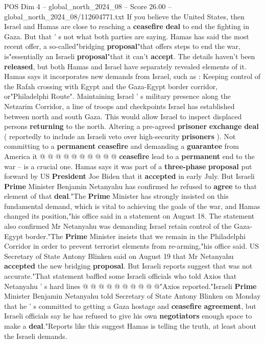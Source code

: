 \begin{textsample}{POS Dim 4 – global\_north\_2024\_08 – Score 26.00 – global\_north\_2024\_08/112604771.txt}  \label{ex:f4_pos_164}
If you believe the United States, then Israel and Hamas are close to reaching a \textbf{ceasefire} \textbf{deal} to end the fighting in Gaza.
But that ' s not what both parties are saying.
Hamas has said the most recent offer, a so-called"bridging \textbf{proposal}"that offers steps to end the war, is"essentially an Israeli \textbf{proposal}"that it can't \textbf{accept}.
The details haven't been \textbf{released}, but both Hamas and Israel have separately revealed elements of it.
Hamas says it incorporates new demands from Israel, such as : Keeping control of the Rafah crossing with Egypt and the Gaza-Egypt border corridor, or"Philadelphi Route".
Maintaining Israel ' s military presence along the Netzarim Corridor, a line of troops and checkpoints Israel has established between north and south Gaza.
This would allow Israel to inspect displaced persons \textbf{returning} to the north.
Altering a pre-agreed \textbf{prisoner} \textbf{exchange} \textbf{deal} ( reportedly to include an Israeli veto over high-security \textbf{prisoners} ).
Not committing to a \textbf{permanent} \textbf{ceasefire} and demanding a \textbf{guarantee} from America it @ @ @ @ @ @ @ @ @ @ \textbf{ceasefire} lead to a \textbf{permanent} end to the war -- is a crucial one.
Hamas says it was part of a \textbf{three-phase} \textbf{proposal} put forward by US \textbf{President} Joe Biden that it \textbf{accepted} in early July.
But Israeli \textbf{Prime} Minister Benjamin Netanyahu has confirmed he refused to \textbf{agree} to that element of that \textbf{deal}."The \textbf{Prime} Minister has strongly insisted on this fundamental demand, which is vital to achieving the goals of the war, and Hamas changed its position,"his office said in a statement on August 18.
The statement also confirmed Mr Netanyahu was demanding Israel retain control of the Gaza-Egypt border."The \textbf{Prime} Minister insists that we remain in the Philadelphi Corridor in order to prevent terrorist elements from re-arming,"his office said.
US Secretary of State Antony Blinken said on August 19 that Mr Netanyahu \textbf{accepted} the new bridging \textbf{proposal}.
But Israeli reports suggest that was not accurate."That statement baffled some Israeli officials who told Axios that Netanyahu ' s hard lines @ @ @ @ @ @ @ @ @ @"Axios reported."Israeli \textbf{Prime} Minister Benjamin Netanyahu told Secretary of State Antony Blinken on Monday that he ' s committed to getting a Gaza hostage and \textbf{ceasefire} \textbf{agreement}, but Israeli officials say he has refused to give his own \textbf{negotiators} enough space to make a \textbf{deal}."Reports like this suggest Hamas is telling the truth, at least about the Israeli demands.

\end{textsample}
